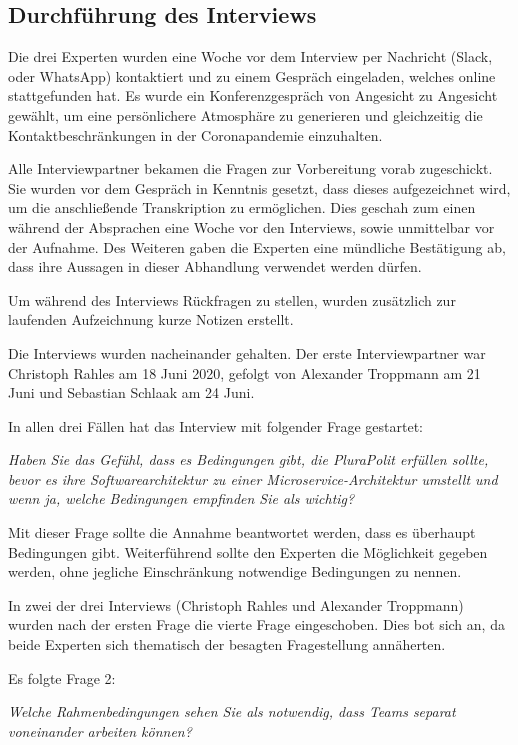 \subsection{Durchführung des Interviews}

Die drei Experten wurden eine Woche vor dem Interview per Nachricht (Slack, oder WhatsApp) kontaktiert und zu einem Gespräch eingeladen, welches online stattgefunden hat. Es wurde ein Konferenzgespräch von Angesicht zu Angesicht gewählt, um eine persönlichere Atmosphäre zu generieren und gleichzeitig die Kontaktbeschränkungen in der Coronapandemie einzuhalten.

Alle Interviewpartner bekamen die Fragen zur Vorbereitung vorab zugeschickt. Sie wurden vor dem Gespräch in Kenntnis gesetzt, dass dieses aufgezeichnet wird, um die anschließende Tran­skrip­ti­on zu ermöglichen. Dies geschah zum einen während der Absprachen eine Woche vor den Interviews, sowie unmittelbar vor der Aufnahme. Des Weiteren gaben die Experten eine mündliche Bestätigung ab, dass ihre Aussagen in dieser Abhandlung verwendet werden dürfen.

Um während des Interviews Rückfragen zu stellen, wurden zusätzlich zur laufenden Aufzeichnung kurze Notizen erstellt.

Die Interviews wurden nacheinander gehalten. Der erste Interviewpartner war Christoph Rahles am 18 Juni 2020, gefolgt von Alexander Troppmann am 21 Juni und Sebastian Schlaak am 24 Juni.

In allen drei Fällen hat das Interview mit folgender Frage gestartet:

\textit{Haben Sie das Gefühl, dass es Bedingungen gibt, die PluraPolit erfüllen sollte, bevor es ihre Softwarearchitektur zu einer Microservice-Architektur umstellt und wenn ja, welche Bedingungen empfinden Sie als wichtig?}

Mit dieser Frage sollte die Annahme beantwortet werden, dass es überhaupt Bedingungen gibt. Weiterführend sollte den Experten die Möglichkeit gegeben werden, ohne jegliche Einschränkung notwendige Bedingungen zu nennen.

In zwei der drei Interviews (Christoph Rahles und Alexander Troppmann) wurden nach der ersten Frage die vierte Frage eingeschoben. Dies bot sich an, da beide Experten sich thematisch der besagten Fragestellung annäherten.

Es folgte Frage 2:

\textit{Welche Rahmenbedingungen sehen Sie als notwendig, dass Teams separat voneinander arbeiten können?}

